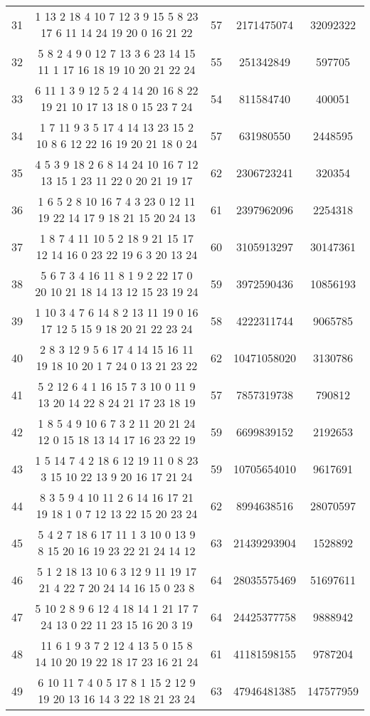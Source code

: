 \documentclass[a4paper,11pt,oneside,openany]{jsbook}
\begin{document}
\begin{table}[]
{\begin{tabular}{|c|c|c|c|c|}
31 & 1 13 2 18 4 10 7 12 3 9 15 5 8 23 17 6 11 14 24 19 20 0 16 21 22  & 57 & 2171475074 & 32092322 \\
32 & 5 8 2 4 9 0 12 7 13 3 6 23 14 15 11 1 17 16 18 19 10 20 21 22 24  & 55 & 251342849 & 597705 \\
33 & 6 11 1 3 9 12 5 2 4 14 20 16 8 22 19 21 10 17 13 18 0 15 23 7 24  & 54 & 811584740 & 400051 \\
34 & 1 7 11 9 3 5 17 4 14 13 23 15 2 10 8 6 12 22 16 19 20 21 18 0 24  & 57 & 631980550 & 2448595 \\
35 & 4 5 3 9 18 2 6 8 14 24 10 16 7 12 13 15 1 23 11 22 0 20 21 19 17  & 62 & 2306723241 & 320354 \\
36 & 1 6 5 2 8 10 16 7 4 3 23 0 12 11 19 22 14 17 9 18 21 15 20 24 13  & 61 & 2397962096 & 2254318 \\
37 & 1 8 7 4 11 10 5 2 18 9 21 15 17 12 14 16 0 23 22 19 6 3 20 13 24  & 60 & 3105913297 & 30147361 \\
38 & 5 6 7 3 4 16 11 8 1 9 2 22 17 0 20 10 21 18 14 13 12 15 23 19 24  & 59 & 3972590436 & 10856193 \\
39 & 1 10 3 4 7 6 14 8 2 13 11 19 0 16 17 12 5 15 9 18 20 21 22 23 24  & 58 & 4222311744 & 9065785 \\
40 & 2 8 3 12 9 5 6 17 4 14 15 16 11 19 18 10 20 1 7 24 0 13 21 23 22  & 62 & 10471058020 & 3130786 \\
41 & 5 2 12 6 4 1 16 15 7 3 10 0 11 9 13 20 14 22 8 24 21 17 23 18 19  & 57 & 7857319738 & 790812 \\
42 & 1 8 5 4 9 10 6 7 3 2 11 20 21 24 12 0 15 18 13 14 17 16 23 22 19  & 59 & 6699839152 & 2192653 \\
43 & 1 5 14 7 4 2 18 6 12 19 11 0 8 23 3 15 10 22 13 9 20 16 17 21 24  & 59 & 10705654010 & 9617691 \\
44 & 8 3 5 9 4 10 11 2 6 14 16 17 21 19 18 1 0 7 12 13 22 15 20 23 24  & 62 & 8994638516 & 28070597 \\
45 & 5 4 2 7 18 6 17 11 1 3 10 0 13 9 8 15 20 16 19 23 22 21 24 14 12  & 63 & 21439293904 & 1528892 \\
46 & 5 1 2 18 13 10 6 3 12 9 11 19 17 21 4 22 7 20 24 14 16 15 0 23 8  & 64 & 28035575469 & 51697611 \\
47 & 5 10 2 8 9 6 12 4 18 14 1 21 17 7 24 13 0 22 11 23 15 16 20 3 19  & 64 & 24425377758 & 9888942 \\
48 & 11 6 1 9 3 7 2 12 4 13 5 0 15 8 14 10 20 19 22 18 17 23 16 21 24  & 61 & 41181598155 & 9787204 \\
49 & 6 10 11 7 4 0 5 17 8 1 15 2 12 9 19 20 13 16 14 3 22 18 21 23 24  & 63 & 47946481385 & 147577959 \\ \hline
\end{tabular}
}
\end{table}
\end{document}
